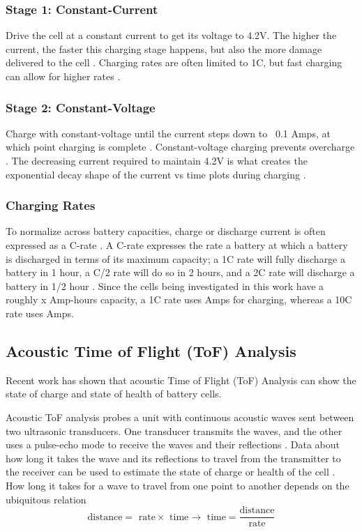 \subsubsection*{Stage 1: Constant-Current} 

Drive the cell at a constant current to get its voltage to 4.2V. The higher the current, the faster this charging stage happens, but also the more damage delivered to the cell \cite{TI}. Charging rates are often limited to 1C, but fast charging can allow for higher rates \cite{TI}.

\subsubsection*{Stage 2: Constant-Voltage}  

Charge with constant-voltage until the current steps down to ~0.1 Amps, at which point charging is complete \cite{DIGIKEY}. Constant-voltage charging prevents overcharge \cite{DIGIKEY}. The decreasing current required to maintain 4.2V is what creates the exponential decay shape of the current vs time plots during charging \cite{TI}.

\subsubsection{Charging Rates}
To normalize across battery capacities, charge or discharge current is often expressed as a C-rate \cite{SPECS}. 
A C-rate expresses the rate a battery at which a battery is discharged in terms of its maximum capacity; a 1C rate will fully discharge a battery in 1 hour, a C/2 rate will do so in 2 hours, and a 2C rate will discharge a battery in 1/2 hour \cite{SPECS}. 
Since the cells being investigated in this work have a roughly x Amp-hours  capacity, a 1C rate uses  Amps for charging, whereas a 10C rate uses  Amps.

\subsection{Acoustic Time of Flight (ToF) Analysis}
Recent work has shown that acoustic Time of Flight (ToF) Analysis can show the state of charge and state of health of battery cells.

Acoustic ToF analysis probes a unit with continuous acoustic waves sent between two ultrasonic transducers. One transducer transmits the waves, and the other uses a pulse-echo mode to receive the waves and their reflections \cite{TOF-STATE}. Data about how long it takes the wave and its reflections to travel from the transmitter to the receiver can be used to estimate the state of charge or health of the cell \cite{TOF-STATE}. 
How long it takes for a wave to travel from one point to another depends on the ubiquitous relation 
$$\text{distance} = \text{ rate} \times \text{ time} \rightarrow \text{ time} = \frac{\text{distance}}{\text{rate}}$$

